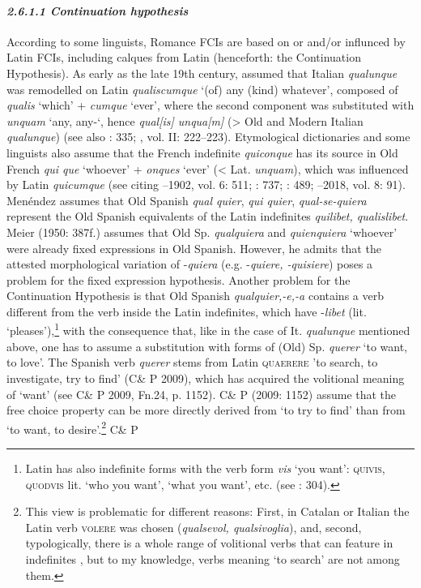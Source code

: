 \documentclass[output=paper]{langscibook}
\begin{document}
\paragraph{\textit{2.6.1.1 Continuation hypothesis}}

According to some linguists, Romance FCIs are based on or and/or influnced by Latin FCIs, including calques from Latin (henceforth: the Continuation Hypothesis). As early as the late 19th century, \citet[57]{Meyer-Lübke1899} assumed that Italian \textit{qualunque} was remodelled on Latin \textit{qualiscumque} ‘(of) any (kind) whatever’, composed of \textit{qualis} ‘which’ + \textit{cumque} ‘ever’, where the second component was substituted with \textit{unquam} ‘any, any-‘, hence \textit{qual[is] unqua[m]} (> Old and Modern Italian \textit{qualunque}) (see also \citealt{CortalazzoZolli1979}: 335; \citealt{Rohlfs1968}, vol. II: 222–223). Etymological dictionaries and some linguists also assume that the French indefinite \textit{quiconque} has its source in Old French \textit{qui que} ‘whoever’ + \textit{onques} ‘ever’ (< Lat. \textit{unquam}), which was influenced by Latin \textit{quicumque} (see \citealt{Becker2014} citing \citealt{Godefroy1880}–1902, vol. 6: 511; \citealt{Gamillscheg1969}: 737; \citealt{Greimas1998}: 489; \citealt{Tobler-Lommatzsch1925}–2018, vol. 8: 91). Menéndez \citet{Pidal1928} assumes that Old Spanish \textit{qual quier}, \textit{qui quier}, \textit{qual-se-quiera} represent the Old Spanish equivalents of the Latin indefinites \textit{quilibet, qualislibet}. Meier (1950: 387f.) assumes that Old Sp. \textit{qualquiera} and \textit{quienquiera} ‘whoever’ were already fixed expressions in Old Spanish. However, he admits that the attested morphological variation of -\textit{quiera} (e.g. -\textit{quiere, -quisiere}) poses a problem for the fixed expression hypothesis. Another problem for the Continuation Hypothesis is that Old Spanish \textit{qualquier,\nobreakdash-e,\nobreakdash-a} contains a verb different from the verb inside the Latin indefinites, which have -\textit{libet} (lit. ‘pleases’),\footnote{\textrm{Latin has also indefinite forms with the verb form} \textrm{\textit{vis}} \textrm{‘you want’:} \textrm{\textsc{quivis}}, \textrm{\textsc{quodvis}} \textrm{lit. ‘who you want’, ‘what you want’, etc. (see \citealt{Pato2012}: 304).}} with the consequence that, like in the case of It. \textit{qualunque} mentioned above, one has to assume a substitution with forms of (Old) Sp. \textit{querer} ‘to want, to love’. The Spanish verb \textit{querer} stems from Latin \textsc{quaerere} ’to search, to investigate, try to find’ (C\& P 2009), which has acquired the volitional meaning of ‘want’ (see C\& P 2009, Fn.24, p. 1152). C\& P (2009: 1152) assume that the free choice property can be more directly derived from ‘to try to find’ than from ‘to want, to desire’.\footnote{ \textrm{This view is problematic for different reasons: First, in Catalan or Italian the Latin verb} \textrm{\textsc{volere}} \textrm{was chosen (}\textrm{\textit{qualsevol, qualsivoglia}}\textrm{), and, second, typologically, there is a whole range of volitional verbs that can feature in indefinites \citep{Haspelmath1997}, but to my knowledge, verbs meaning ‘to search’ are not among them.}} C\& P 
\end{document}
